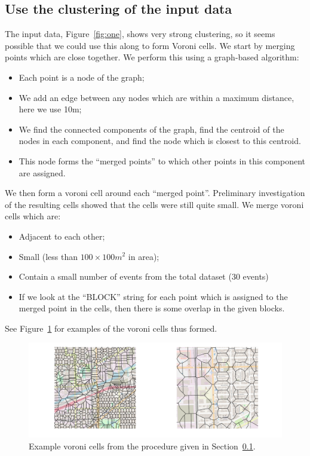 \documentclass[twoside,a4paper,twocolumn,10pt]{article}
\theoremstyle{plain}
\theoremstyle{definition}
\begin{document}
\subsection{Use the clustering of the input data}\label{sec:chicago_vor_from_clusters}

The input data, Figure~\ref{fig:one}, shows very strong clustering, so it seems possible
that we could use this along to form Voroni cells.  We start by merging points which are
close together.  We perform this using a graph-based algorithm:
\begin{itemize}
\item Each point is a node of the graph;
\item We add an edge between any nodes which are within a maximum distance, here we use 10m;
\item We find the connected components of the graph, find the centroid of the nodes in
each component, and find the node which is closest to this centroid.
\item This node forms the ``merged points'' to which other points in this component are
assigned.
\end{itemize}
We then form a voroni cell around each ``merged point''.  Preliminary investigation of the
resulting cells showed that the cells were still quite small.  We merge voroni cells which
are:
\begin{itemize}
\item Adjacent to each other;
\item Small (less than $100\times 100 m^2$ in area);
\item Contain a small number of events from the total dataset (30 events)
\item If we look at the ``BLOCK'' string for each point which is assigned to the merged
point in the cells, then there is some overlap in the given blocks.
\end{itemize}
See Figure~\ref{fig:chicago_vor_3} for examples of the voroni cells thus formed.

\begin{figure}
  \includegraphics[width=\textwidth]{chiago_voroni_clustering_polys.png}
  \caption{Example voroni cells from the procedure given in
  Section~\ref{sec:chicago_vor_from_clusters}.}
  \label{fig:chicago_vor_3}
\end{figure}
\end{document}
